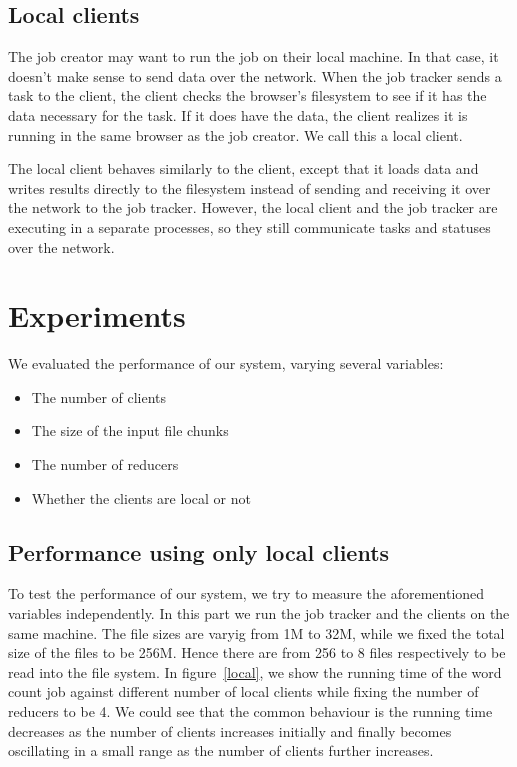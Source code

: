 \documentclass{article} %
\begin{document}
\subsection{Local clients}
The job creator may want to run the job on their local machine. In that case, it
doesn't make sense to send data over the network. When the job tracker sends a
task to the client, the client checks the browser's filesystem to see if it has
the data necessary for the task. If it does have the data, the client realizes
it is running in the same browser as the job creator. We call this a local
client.

The local client behaves similarly to the client, except that it loads data and
writes results directly to the filesystem instead of sending and receiving it
over the network to the job tracker. However, the local client and the job
tracker are executing in a separate processes, so they still communicate tasks
and statuses over the network.

\section{Experiments}
We evaluated the performance of our system, varying several variables:
\begin{itemize}
  \item The number of clients
  \item The size of the input file chunks
  \item The number of reducers
  \item Whether the clients are local or not
\end{itemize}

\subsection{Performance using only local clients}
To test the performance of our system, we try to measure the aforementioned 
variables independently. In this part we run the job tracker and the clients 
on the same machine. The file sizes are varyig from 1M to 32M, while we fixed 
the total size of the files to be 256M. Hence there are from 256 to 8 files 
respectively to be read into the file system. In figure~\ref{local}, we show 
the running time of the word count job against different number of local 
clients while fixing the number of reducers to be 4. We could see that the 
common behaviour is the running time decreases as the number of clients increases
initially and finally becomes oscillating in a small range as the number of 
clients further increases.
\end{document}
